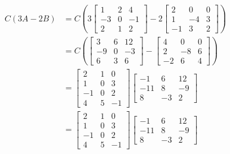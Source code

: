 \documentclass{article}
\begin{document}
\begin{align*}
    C(3A - 2B)
     & =
    C
    \left( 3
    \begin{bmatrix}
        1  & 2 & 4  \\
        -3 & 0 & -1 \\
        2  & 1 & 2
    \end{bmatrix} - 2
    \begin{bmatrix}
        2  & 0  & 0 \\
        1  & -4 & 3 \\
        -1 & 3  & 2
    \end{bmatrix}
    \right)                    \\
     & =
    C
    \left(
    \begin{bmatrix}
        3  & 6 & 12 \\
        -9 & 0 & -3 \\
        6  & 3 & 6
    \end{bmatrix} -
    \begin{bmatrix}
        4  & 0  & 0 \\
        2  & -8 & 6 \\
        -2 & 6  & 4
    \end{bmatrix}
    \right)                    \\
     & =
    \begin{bmatrix}
        2  & 1 & 0  \\
        1  & 0 & 3  \\
        -1 & 0 & 2  \\
        4  & 5 & -1
    \end{bmatrix}
    \begin{bmatrix}
        -1  & 6  & 12 \\
        -11 & 8  & -9 \\
        8   & -3 & 2
    \end{bmatrix} \\
     & =
    \begin{bmatrix}
        2  & 1 & 0  \\
        1  & 0 & 3  \\
        -1 & 0 & 2  \\
        4  & 5 & -1
    \end{bmatrix}
    \begin{bmatrix}
        -1  & 6  & 12 \\
        -11 & 8  & -9 \\
        8   & -3 & 2
    \end{bmatrix} \\

\end{align*}
\end{document}
